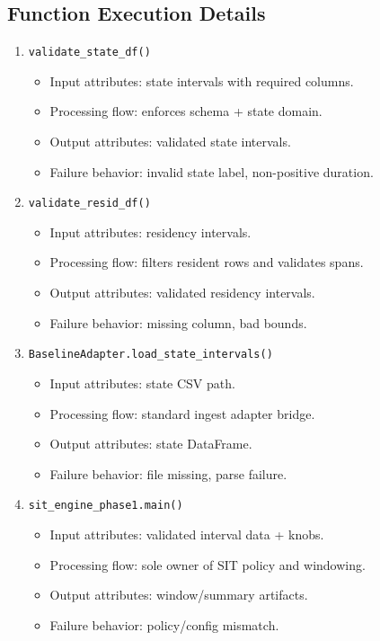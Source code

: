\documentclass[11pt,a4paper]{article}
\begin{document}
\subsection*{Function Execution Details}
\begin{enumerate}[leftmargin=*]
  \item \texttt{validate\_state\_df()}
  \begin{itemize}[leftmargin=*]
    \item Input attributes: state intervals with required columns.
    \item Processing flow: enforces schema + state domain.
    \item Output attributes: validated state intervals.
    \item Failure behavior: invalid state label, non-positive duration.
  \end{itemize}
  \item \texttt{validate\_resid\_df()}
  \begin{itemize}[leftmargin=*]
    \item Input attributes: residency intervals.
    \item Processing flow: filters resident rows and validates spans.
    \item Output attributes: validated residency intervals.
    \item Failure behavior: missing column, bad bounds.
  \end{itemize}
  \item \texttt{BaselineAdapter.load\_state\_intervals()}
  \begin{itemize}[leftmargin=*]
    \item Input attributes: state CSV path.
    \item Processing flow: standard ingest adapter bridge.
    \item Output attributes: state DataFrame.
    \item Failure behavior: file missing, parse failure.
  \end{itemize}
  \item \texttt{sit\_engine\_phase1.main()}
  \begin{itemize}[leftmargin=*]
    \item Input attributes: validated interval data + knobs.
    \item Processing flow: sole owner of SIT policy and windowing.
    \item Output attributes: window/summary artifacts.
    \item Failure behavior: policy/config mismatch.
  \end{itemize}
\end{enumerate}
\end{document}
